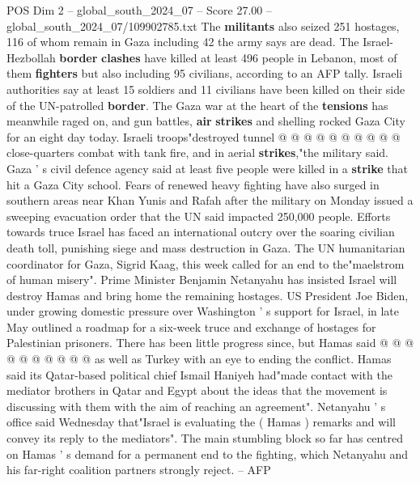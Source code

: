 \begin{textsample}{POS Dim 2 – global\_south\_2024\_07 – Score 27.00 – global\_south\_2024\_07/109902785.txt}
The \textbf{militants} also seized 251 hostages, 116 of whom remain in Gaza including 42 the army says are dead.
The Israel-Hezbollah \textbf{border} \textbf{clashes} have killed at least 496 people in Lebanon, most of them \textbf{fighters} but also including 95 civilians, according to an AFP tally.
Israeli authorities say at least 15 soldiers and 11 civilians have been killed on their side of the UN-patrolled \textbf{border}.
The Gaza war at the heart of the \textbf{tensions} has meanwhile raged on, and gun battles, \textbf{air} \textbf{strikes} and shelling rocked Gaza City for an eight day today.
Israeli troops"destroyed tunnel @ @ @ @ @ @ @ @ @ @ close-quarters combat with tank fire, and in aerial \textbf{strikes},"the military said.
Gaza ' s civil defence agency said at least five people were killed in a \textbf{strike} that hit a Gaza City school.
Fears of renewed heavy fighting have also surged in southern areas near Khan Yunis and Rafah after the military on Monday issued a sweeping evacuation order that the UN said impacted 250,000 people.
Efforts towards truce Israel has faced an international outcry over the soaring civilian death toll, punishing siege and mass destruction in Gaza.
The UN humanitarian coordinator for Gaza, Sigrid Kaag, this week called for an end to the"maelstrom of human misery".
Prime Minister Benjamin Netanyahu has insisted Israel will destroy Hamas and bring home the remaining hostages.
US President Joe Biden, under growing domestic pressure over Washington ' s support for Israel, in late May outlined a roadmap for a six-week truce and exchange of hostages for Palestinian prisoners.
There has been little progress since, but Hamas said @ @ @ @ @ @ @ @ @ @ as well as Turkey with an eye to ending the conflict.
Hamas said its Qatar-based political chief Ismail Haniyeh had"made contact with the mediator brothers in Qatar and Egypt about the ideas that the movement is discussing with them with the aim of reaching an agreement".
Netanyahu ' s office said Wednesday that"Israel is evaluating the ( Hamas ) remarks and will convey its reply to the mediators".
The main stumbling block so far has centred on Hamas ' s demand for a permanent end to the fighting, which Netanyahu and his far-right coalition partners strongly reject. -- AFP

\end{textsample}
